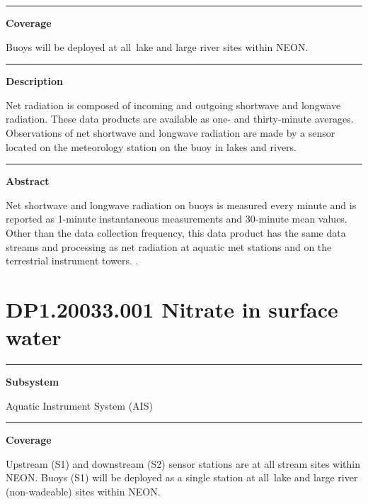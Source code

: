 \documentclass[]{article}
\begin{document}
\begin{center}\rule{0.5\linewidth}{\linethickness}\end{center}

\textbf{Coverage}

Buoys will be deployed at all~lake and large river sites within NEON.

\begin{center}\rule{0.5\linewidth}{\linethickness}\end{center}

\textbf{Description}

Net radiation is composed of incoming and outgoing shortwave and
longwave radiation. These data products are available as one- and
thirty-minute averages. Observations of net shortwave and longwave
radiation are made by a sensor located on the meteorology station on the
buoy in lakes and rivers.

\begin{center}\rule{0.5\linewidth}{\linethickness}\end{center}

\textbf{Abstract}

Net shortwave and longwave radiation on buoys is measured every minute
and is reported as 1-minute instantaneous measurements and 30-minute
mean values. Other than the data collection frequency, this data product
has the same data streams and processing as net radiation at aquatic met
stations and on the terrestrial instrument towers. \newpage
.

\section{DP1.20033.001 Nitrate in surface
water}\label{dp1.20033.001-nitrate-in-surface-water}

\begin{center}\rule{0.5\linewidth}{\linethickness}\end{center}

\textbf{Subsystem}

Aquatic Instrument System (AIS)

\begin{center}\rule{0.5\linewidth}{\linethickness}\end{center}

\textbf{Coverage}

Upstream (S1) and downstream (S2) sensor stations are at all stream
sites within NEON. Buoys (S1) will be deployed as a single station at
all~lake and large river (non-wadeable) sites within NEON.
\end{document}
